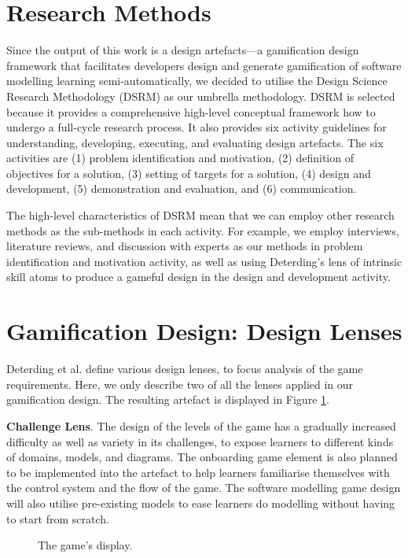 \documentclass[runningheads,a4paper]{llncs}
\begin{document}
\section{Research Methods}
Since the output of this work is a design artefacts---a gamification design framework that facilitates developers design and generate gamification of software modelling learning semi-automatically, we decided to utilise the Design Science Research Methodology (DSRM) \cite{peffers2007design} as our umbrella methodology. DSRM is selected because it provides a comprehensive high-level conceptual framework how to undergo a full-cycle research process. It also provides six activity guidelines for understanding, developing, executing, and evaluating design artefacts. The six activities are (1) problem identification and motivation, (2) definition of objectives for a solution, (3) setting of targets for a solution, (4) design and development, (5) demonstration and evaluation, and (6) communication. 

The high-level characteristics of DSRM mean that we can employ other research methods as the sub-methods in each activity. For example, we employ interviews, literature reviews, and discussion with experts as our methods in problem identification and motivation activity, as well as using Deterding's lens of intrinsic skill atoms \cite{deterding2015lens} to produce a gameful design in the design and development activity.

\section{Gamification Design: Design Lenses}
Deterding et al. \cite{deterding2015lens} define various design lenses, to focus analysis of the game requirements. Here, we only describe two of all the lenses applied in our gamification design. The resulting artefact is displayed in Figure \ref{fig:001}.

\textbf{Challenge Lens}. The design of the levels of the game has a gradually increased difficulty as well as variety in its challenges, to expose learners to different kinds of domains, models, and diagrams. The onboarding game element is also planned to be implemented into the artefact to help learners familiarise themselves with the control system and the flow of the game. The software modelling game design will also utilise pre-existing models to ease learners do modelling without having to start from scratch.

\begin{figure}[t]
\centering
{}
\caption{The game's display.}
\label{fig:001}
\end{figure}
\end{document}
